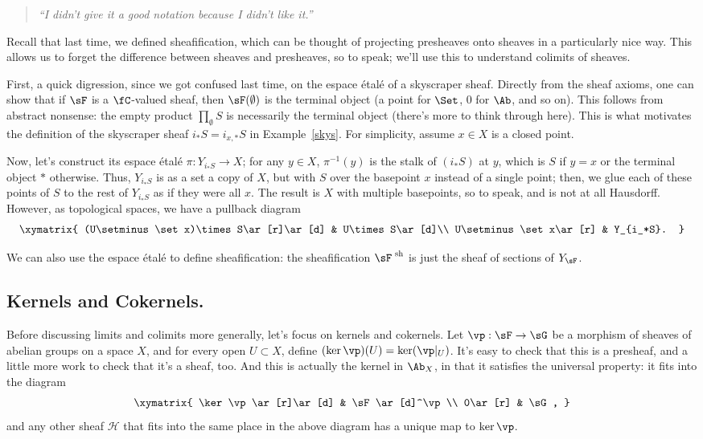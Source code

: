 \begin{quote}\textit{
	``I didn't give it a good notation because I didn't like it.''
}\end{quote}
Recall that last time, we defined sheafification, which can be thought of projecting presheaves onto sheaves in a
particularly nice way. This allows us to forget the difference between sheaves and presheaves, so to speak; we'll
use this to understand colimits of sheaves.
\begin{exm}%
First, a quick digression, since we got confused last time, on the espace étalé of a skyscraper sheaf. Directly
from the sheaf axioms, one can show that if \(\sF\) is a \(\fC\)-valued sheaf, then \(\sF(\emptyset)\) is the
terminal object (a point for \(\Set\), \(0\) for \(\Ab\), and so on). This follows from abstract nonsense: the
empty product \(\prod_\emptyset S\) is necessarily the terminal object (there's more to think through here). This
is what motivates the definition of the skyscraper sheaf \(i_*S = i_{x,*}S\) in Example~\ref{skys}. For
simplicity, assume \(x\in X\) is a closed point.

Now, let's construct its espace étalé \(\pi:Y_{i_*S}\to X\); for any \(y\in X\), \(\pi^{-1}(y)\) is the stalk of
\((i_*S)\) at \(y\), which is \(S\) if \(y = x\) or the terminal object \(*\) otherwise. Thus, \(Y_{i_*S}\) is as a
set a copy of \(X\), but with \(S\) over the basepoint \(x\) instead of a single point; then, we glue each of these
points of \(S\) to the rest of \(Y_{i_*S}\) as if they were all \(x\). The result is \(X\) with multiple
basepoints, so to speak, and is not at all Hausdorff. However, as topological spaces, we have a pullback diagram
\[\xymatrix{
	(U\setminus\set x)\times S\ar[r]\ar[d] & U\times S\ar[d]\\
	U\setminus\set x\ar[r] & Y_{i_*S}.
}\]
\end{exm}
We can also use the espace étalé to define sheafification: the sheafification \(\sF\sh\) is just the sheaf of
sections of \(Y_\sF\).
\subsection*{Kernels and Cokernels.}
Before discussing limits and colimits more generally, let's focus on kernels and cokernels. Let \(\vp:\sF\to\sG\)
be a morphism of sheaves of abelian groups on a space \(X\), and for every open \(U\subset X\), define
\((\ker\vp)(U) = \ker(\vp|_U)\). It's easy to check that this is a presheaf, and a little more work to check that
it's a sheaf, too. And this is actually the kernel in \(\Ab_X\), in that it satisfies the universal property:
it fits into the diagram
\[\xymatrix{
	\ker\vp\ar[r]\ar[d] & \sF\ar[d]^\vp\\
	0\ar[r] & \sG,
}\]
and any other sheaf \(\mathscr H\) that fits into the same place in the above diagram has a unique map to
\(\ker\vp\).

